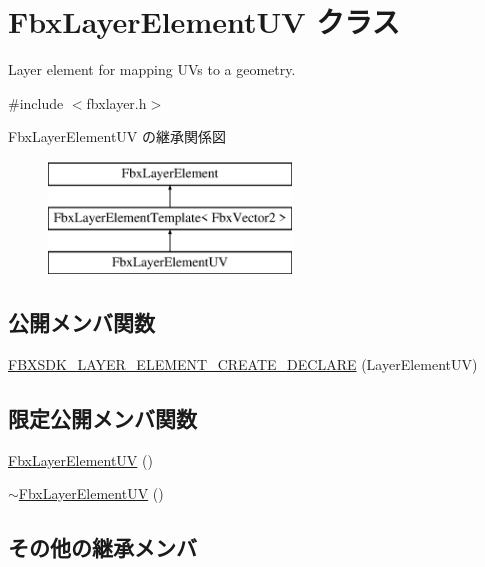 \hypertarget{class_fbx_layer_element_u_v}{}\section{Fbx\+Layer\+Element\+UV クラス}
\label{class_fbx_layer_element_u_v}


Layer element for mapping U\+Vs to a geometry.  




{\ttfamily \#include $<$fbxlayer.\+h$>$}

Fbx\+Layer\+Element\+UV の継承関係図\begin{figure}[H]
\begin{center}
\leavevmode
\includegraphics[height=3.000000cm]{class_fbx_layer_element_u_v}
\end{center}
\end{figure}
\subsection*{公開メンバ関数}
\begin{DoxyCompactItemize}
\item 
\hyperlink{class_fbx_layer_element_u_v_a724a1f79f2ff129ca3be535db9de2245}{F\+B\+X\+S\+D\+K\+\_\+\+L\+A\+Y\+E\+R\+\_\+\+E\+L\+E\+M\+E\+N\+T\+\_\+\+C\+R\+E\+A\+T\+E\+\_\+\+D\+E\+C\+L\+A\+RE} (Layer\+Element\+UV)
\end{DoxyCompactItemize}
\subsection*{限定公開メンバ関数}
\begin{DoxyCompactItemize}
\item 
\hyperlink{class_fbx_layer_element_u_v_aaae1d6237b2f507a37344bc53f7667b0}{Fbx\+Layer\+Element\+UV} ()
\item 
\hyperlink{class_fbx_layer_element_u_v_a2906e0439687d1a8aa41b1f68c0990d7}{$\sim$\+Fbx\+Layer\+Element\+UV} ()
\end{DoxyCompactItemize}
\subsection*{その他の継承メンバ}


